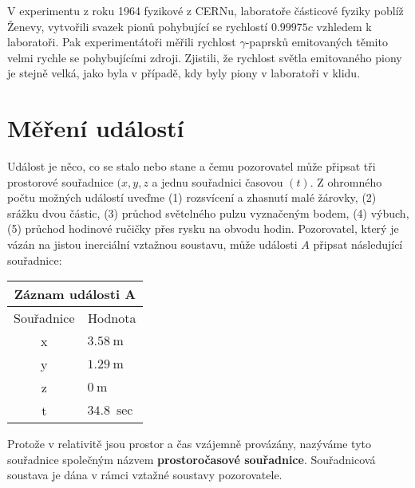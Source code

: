         V experimentu z roku 1964 fyzikové z CERNu, laboratoře částicové fyziky poblíž Ženevy,
        vytvořili svazek pionů pohybující se rychlostí \(\num{0.999 75}c\) vzhledem k laboratoři.
        Pak experimentátoři měřili rychlost \(\gamma\)-paprsků emitovaných těmito velmi rychle se
        pohybujícími zdroji. Zjistili, že rychlost světla emitovaného piony je stejně velká, jako
        byla v případě, kdy byly piony v laboratoři v klidu.

          

  \section{Měření událostí}
    Událost je něco, co se stalo nebo stane a čemu pozorovatel může připsat tři prostorové
    souřadnice \((x, y, z\) a jednu souřadnici časovou \((t)\). Z ohromného počtu možných událostí
    uveďme (1) rozsvícení a zhasnutí malé žárovky, (2) srážku dvou částic, (3) průchod světelného
    pulzu vyznačeným bodem, (4) výbuch, (5) průchod hodinové ručičky přes rysku na obvodu hodin.
    Pozorovatel, který je vázán na jistou inerciální vztažnou soustavu, může události \(A\) připsat
    následující souřadnice:

    \begin{table}[ht!]
      \centering
      \renewcommand{\arraystretch}{1.0}  
      \begin{tabular}{@{}cl@{}}
        \toprule
        \multicolumn{2}{c}{\textbf{Záznam události A}} \\ \midrule
        Souřadnice    & \multicolumn{1}{c}{Hodnota}    \\ \midrule
        x             & \(\SI{3.58}{\m}\)              \\
        y             & \(\SI{1.29}{\m}\)              \\
        z             & \(\SI{0}{\m}\)                 \\
        t             & \(\SI{34.8}{\sec}\)           
      \end{tabular}
    \end{table}

    Protože v relativitě jsou prostor a čas vzájemně provázány, nazýváme tyto souřadnice společným
    názvem \textbf{prostoročasové souřadnice}. Souřadnicová soustava je dána v rámci vztažné
    soustavy pozorovatele.

